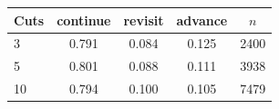 \begin{tabular}{lcccc}
\toprule
Cuts & continue & revisit & advance & $n$ \\
\midrule
3 & 0.791 & 0.084 & 0.125 & 2400 \\
5 & 0.801 & 0.088 & 0.111 & 3938 \\
10 & 0.794 & 0.100 & 0.105 & 7479 \\
\bottomrule
\end{tabular}
